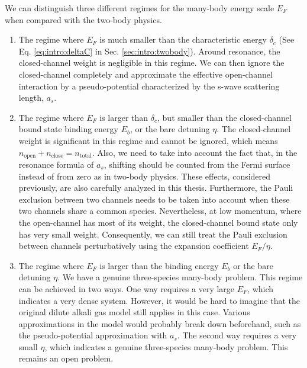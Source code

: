 We can distinguish three different regimes for the many-body energy scale $E_F$ when compared with the two-body physics.  
\begin{enumerate}
\item The regime where $E_F$ is much smaller than the characteristic energy $\delta_c$ (See Eq. \ref{eq:intro:deltaC} in Sec. \ref{sec:intro:twobody}). Around resonance, the closed-channel weight is negligible in this regime. We can then ignore the closed-channel completely and approximate the effective open-channel interaction by a  pseudo-potential characterized by the s-wave scattering length, $a_s$. 
\item The regime where  $E_F$ is larger than $\delta_c$, but smaller than the closed-channel bound state binding energy $E_b$, or the bare detuning $\eta$.  The closed-channel weight is significant in this regime and cannot be ignored, which means $n_{\text{open}}+n_{\text{close}}=n_{\text{total}}$. Also, we need to take into account the fact that, in the resonance formula of $a_s$, shifting should be counted from the Fermi surface instead of from zero as in two-body physics.    These effects, considered previously\cite{GurarieNarrow}, are  also carefully analyzed in this thesis.  Furthermore, the Pauli exclusion between two channels needs to be taken into account when these two channels share a common species.  Nevertheless, at  low momentum, where the open-channel has most of its weight, the closed-channel bound state only has very small weight.  Consequently, we can still treat the Pauli exclusion between channels perturbatively using the expansion coefficient  $E_F/\eta$. 
\item The regime where  $E_F$ is larger than the binding energy $E_b$ or the bare detuning $\eta$. We have a genuine three-species many-body problem. This regime can be achieved in two ways.  One way requires a very large $E_F$, which indicates a very dense system.  However, it would be hard to imagine that  the original dilute alkali gas model still applies in this case. Various approximations in the model would probably break down beforehand, such as the pseudo-potential approximation with $a_s$. The second way requires a very small $\eta$, which indicates a genuine three-species many-body problem.  This remains an open problem.   
\end{enumerate}
 

 



